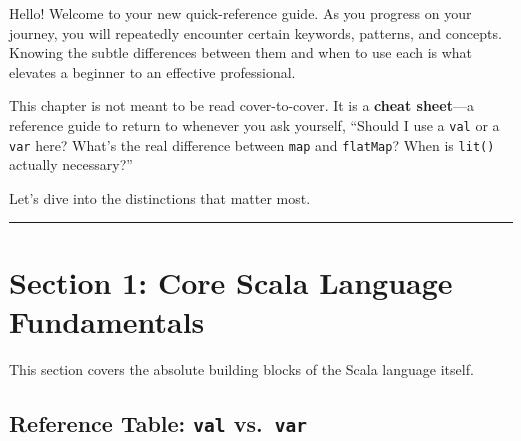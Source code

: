 \documentclass[
  letterpaper,
  DIV=11,
  numbers=noendperiod]{scrreprt}
\begin{document}
Hello! Welcome to your new quick-reference guide. As you progress on
your journey, you will repeatedly encounter certain keywords, patterns,
and concepts. Knowing the subtle differences between them and when to
use each is what elevates a beginner to an effective professional.

This chapter is not meant to be read cover-to-cover. It is a
\textbf{cheat sheet}---a reference guide to return to whenever you ask
yourself, ``Should I use a \texttt{val} or a \texttt{var} here? What's
the real difference between \texttt{map} and \texttt{flatMap}? When is
\texttt{lit()} actually necessary?''

Let's dive into the distinctions that matter most.

\begin{center}\rule{0.5\linewidth}{0.5pt}\end{center}

\section{\texorpdfstring{\textbf{Section 1: Core Scala Language
Fundamentals}}{Section 1: Core Scala Language Fundamentals}}\label{section-1-core-scala-language-fundamentals}

This section covers the absolute building blocks of the Scala language
itself.

\subsection{\texorpdfstring{\textbf{Reference Table: \texttt{val}
vs.~\texttt{var}}}{Reference Table: val vs.~var}}\label{reference-table-val-vs.-var}
\end{document}
